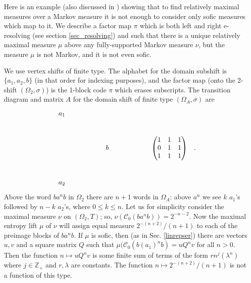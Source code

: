 \documentclass{kepart2010}
\theoremstyle{plain}
\theoremstyle{definition}
\theoremstyle{remark}
\theoremstyle{definition}
\numberwithin{equation}{section}
\begin{document}
\begin{ex}\label{ex_nosofics}

Here is an example (also discussed in \cite[Example
1]{PetersenQuasShin2003}) showing that to find relatively maximal
measures over a Markov measure it is not enough to consider only
sofic measures which map to it. We describe a factor map $\pi$ which
is both left and right e-resolving (see section \ref{sec_resolving})
and such that there is a unique relatively maximal measure $\mu$
above any fully-supported Markov measure $\nu$, but the measure
$\mu$
is not Markov, and it is not even sofic.

We use vertex shifts of finite type.
    The alphabet for the domain subshift is $\{a_1, a_2, b\}$
    (in that order for indexing purposes),
    and the factor map (onto the 2-shift $(\Omega_2,\sigma)$) is the
    1-block code $\pi$ which
    erases subscripts. The transition diagram and matrix $A$ for the domain
    shift of finite type $(\Omega_A,\sigma)$ are
    \begin{equation}
    \begin{gathered}
    \mbox{
    \xymatrix{
    a_1\ar@(ul,dl)[]\ar@{<->}[drr]\ar@{->}[dd]\\
    &&b\ar@(ur,dr)[]
  &&\mbox
    {
    $\begin{pmatrix}
    1 & 1 & 1\\
    0 & 1 & 1\\
    1 & 1 &1
    \end{pmatrix}$\quad .}
    \\
    a_2\ar@(ul,dl)[]\ar@{<->}[urr]
    }}
    \end{gathered}
    \end{equation}
Above the word $ba^nb$ in $\Omega_2$ there are $n+1$ words in
$\Omega_A$: above $a^n$ we see $k$ $a_1$'s followed by $n-k$
$a_2$'s, where $0 \leq k \leq n$. Let us for simplicity consider the
maximal measure $\nu$ on $(\Omega_2,T)$; so, $\nu (\mathcal
C_0(ba^nb))
=2^{-n-2}$. Now the maximal entropy lift $\mu$ of $\nu$ will assign
equal measure $2^{-(n+2)}/(n+1)$ to each of the preimage blocks
of $ba^nb$.
If $\mu$ is sofic, then
(as in Sec. \ref{linrepser})
there are vectors $u,v$ and a square  matrix
$Q$ such that
$\mu (\mathcal C_0(b(a_1)^nb)= uQ^nv$ for all $n>0$.
Then
the function $n\mapsto uQ^nv$ is some finite sum of terms
of the form $r n^j (\lambda^n)$ where $j\in \mathbb Z_+$ and $r,
\lambda$ are constants. The function
$n\mapsto 2^{-(n+2)}/(n+1)$
 is
not a function of this type.
\end{ex}
\end{document}
